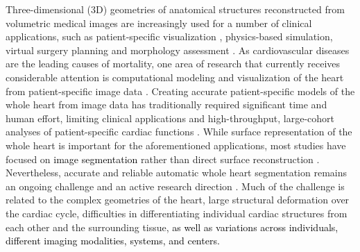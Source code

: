 \documentclass[times,review,preprint,authoryear]{elsarticle}
\begin{document}
Three-dimensional (3D) geometries of anatomical structures reconstructed from volumetric medical images are increasingly used for a number of clinical applications, such as patient-specific visualization \citep{GonzalezIzard2020}, physics-based simulation, virtual surgery planning and morphology assessment \citep{Prakosa2018, Bucioli2017}. As cardiovascular diseases are the leading causes of mortality, one area of research that currently receives considerable attention is computational modeling and visualization of the heart from patient-specific image data \citep{Prakosa2018, Chnafa2016, Khalafvand2012}. 
Creating accurate patient-specific models of the whole heart from image data has traditionally required significant time and human effort, limiting clinical applications and high-throughput, large-cohort analyses of patient-specific cardiac functions \citep{Mittal}. While surface representation of the whole heart is important for the aforementioned applications, most studies have focused on \textcolor{black}{image segmentation} rather than direct surface reconstruction \citep{Payer2018, BAI201598, Ye2019}. Nevertheless, accurate and reliable automatic whole heart segmentation remains an ongoing challenge and an active research direction \citep{ZHUANG2019, Zhuang2013,Peng2016}. Much of the challenge is related to the complex geometries of the heart, large structural deformation over the cardiac cycle, difficulties in differentiating individual cardiac structures from each other and the surrounding tissue, \textcolor{black}{as well as variations across individuals, different imaging modalities, systems, and centers.}
\end{document}
